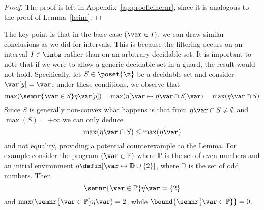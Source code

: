 \begin{proof}
  The proof is left in Appendix~\ref{ap:proofleincrnr}, since it is
  analogous to the proof of Lemma~\ref{le:inc}.
\end{proof}

\begin{remark}
  The key point is that in the base case \((\var \in I)\), we can draw
  similar conclusions as we did for intervals. This is because the
  filtering occurs on an interval \(I \in \inte\) rather than on an
  arbitrary decidable set. It is important to note that if we were to
  allow a generic decidable set in a guard, the result would not
  hold. Specifically, let \(S \in \poset{\z}\) be a decidable set and
  consider \(\var[y] = \var\); under these conditions, we observe that
  \begin{equation}
    \max(\semnr{\var\in S}\eta\var[y]) = \max(\eta[\var \mapsto \eta\var \cap S]\var) = \max(\eta\var \cap S)
  \end{equation}
  Since \(S\) is generally non-convex what happens is that from
  \(\eta \var \cap S \neq \emptyset\) and \(\max(S) = +\infty\) we can
  only deduce
  \begin{equation}
    \max(\eta\var \cap S) \leq \max(\eta\var)
  \end{equation}
  and not equality, providing a potential counterexample to the
  Lemma. For example consider the program \((\var\in\mathbb{P})\)
  where \(\mathbb{P}\) is the set of even numbers and an initial
  environment \({\eta \defin [\var\mapsto \mathbb{D} \cup \{2\}]}\),
  where \(\mathbb{D}\) is the set of odd numbers. Then
  \begin{equation*}
    {\semnr{\var\in\mathbb{P}}\eta\var} = \{2\}
  \end{equation*}
  and \(\max({\semnr{\var\in\mathbb{P}}\eta\var}) = 2\), while
  \(\bound{\semnr{\var\in\mathbb{P}}} = 0\).

  \medskip


\end{remark}
